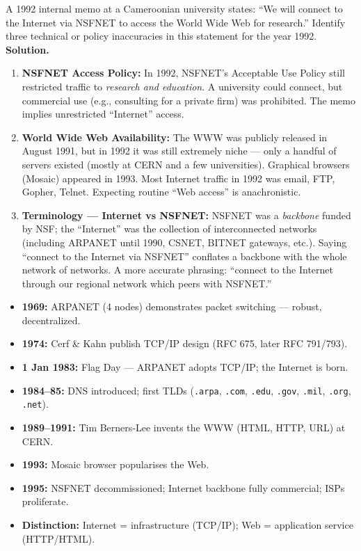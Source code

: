 \documentclass[11pt]{article}
\newcounter{popsec}
\newcounter{popsub}
\newcommand{\courssub}[1]{%
  \stepcounter{popsub}%
  \par\vspace{9pt}\noindent{\popxbold\fontsize{11.5}{13}\selectfont\color{popink}{\color{poporange}\thepopsec.\thepopsub}\hspace{6pt}#1}\par\nopagebreak\vspace{4pt}
}
\begin{document}
\begin{exoresolu}[Question]
A 1992 internal memo at a Cameroonian university states: “We will connect to the Internet via NSFNET to access the World Wide Web for research.” Identify three technical or policy inaccuracies in this statement for the year 1992.
\tcblower
\textbf{Solution.}
\begin{enumerate}
    \item \textbf{NSFNET Access Policy:} In 1992, NSFNET’s Acceptable Use Policy still restricted traffic to \emph{research and education}. A university could connect, but commercial use (e.g., consulting for a private firm) was prohibited. The memo implies unrestricted “Internet” access.
    \item \textbf{World Wide Web Availability:} The WWW was publicly released in August 1991, but in 1992 it was still extremely niche — only a handful of servers existed (mostly at CERN and a few universities). Graphical browsers (Mosaic) appeared in 1993. Most Internet traffic in 1992 was email, FTP, Gopher, Telnet. Expecting routine “Web access” is anachronistic.
    \item \textbf{Terminology — Internet vs NSFNET:} NSFNET was a \emph{backbone} funded by NSF; the “Internet” was the collection of interconnected networks (including ARPANET until 1990, CSNET, BITNET gateways, etc.). Saying “connect to the Internet via NSFNET” conflates a backbone with the whole network of networks. A more accurate phrasing: “connect to the Internet through our regional network which peers with NSFNET.”
\end{enumerate}
\end{exoresolu}

\courssub{Key Points to Retain}

\begin{aretenir}
\begin{itemize}
    \item \textbf{1969:} ARPANET (4 nodes) demonstrates packet switching — robust, decentralized.
    \item \textbf{1974:} Cerf \& Kahn publish TCP/IP design (RFC 675, later RFC 791/793).
    \item \textbf{1 Jan 1983:} Flag Day — ARPANET adopts TCP/IP; the Internet is born.
    \item \textbf{1984–85:} DNS introduced; first TLDs (\texttt{.arpa}, \texttt{.com}, \texttt{.edu}, \texttt{.gov}, \texttt{.mil}, \texttt{.org}, \texttt{.net}).
    \item \textbf{1989–1991:} Tim Berners‑Lee invents the WWW (HTML, HTTP, URL) at CERN.
    \item \textbf{1993:} Mosaic browser popularises the Web.
    \item \textbf{1995:} NSFNET decommissioned; Internet backbone fully commercial; ISPs proliferate.
    \item \textbf{Distinction:} Internet = infrastructure (TCP/IP); Web = application service (HTTP/HTML).
\end{itemize}
\end{aretenir}
\end{document}

